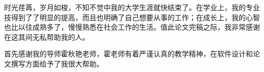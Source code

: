 时光荏苒，岁月如梭，不知不觉中我的大学生涯就快结束了。在学业上，我的专业技得到了了明显的提高，而且也明确了自己想要从事的工作；在成长上，我的心智也比以往成熟多了，慢慢熟悉在社会工作的生活。值此论文完稿之际，我非常感谢在这其间无私帮助我的人。

首先感谢我的导师霍秋艳老师，霍老师有着严谨认真的教学精神，在软件设计和论文撰写方面给予了我很大帮助。